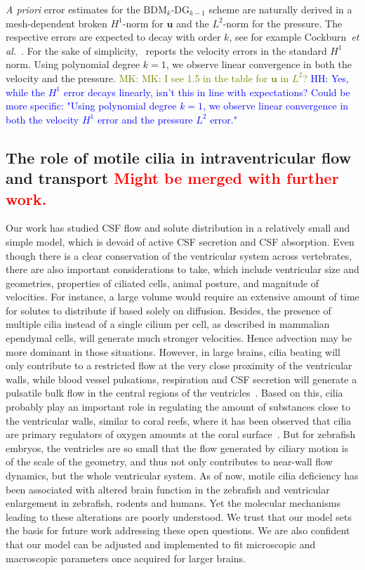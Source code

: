 \documentclass[fleqn]{wlscirep}
\newcommand{\uu}{\mathbf{u}}
\newcommand{\lyng}[1]{\textcolor{blue}{#1}}
\newcommand{\mk}[1]{\textcolor{olive}{MK: #1}}
\newcommand{\fixme}[1]{\textcolor{red}{#1}}
\begin{document}
\emph{A priori} error estimates for the $\mathrm{BDM}_k$-$\mathrm{DG}_{k-1}$ scheme are naturally 
derived in a mesh-dependent broken $H^1$-norm for $\uu$ and the $L^2$-norm for the pressure. The respective 
errors are expected to decay with order $k$,
see for example Cockburn~\emph{et al.}~\cite{Cockburn2005AEquations}.
For the sake of simplicity,~
reports the velocity errors in the standard $H^1$ norm. Using polynomial degree  
$k=1$, we observe linear convergence in both the velocity and the pressure.   
\mk{MK: I see 1.5 in the table for $\uu$ in $L^2$?}
\lyng{HH: Yes, while the $H^1$ error decays linearly, isn't this in line with expectations?
Could be more specific: "Using polynomial degree 
$k=1$, we observe linear convergence in both the velocity $H^1$ error and the pressure $L^2$ error."}

\subsection*{The role of motile cilia in intraventricular flow and transport
\fixme{Might be merged with further work.}}
Our work has studied CSF flow and solute distribution
in a relatively small and simple model, which is devoid of
active CSF secretion and CSF absorption. Even though there is
a clear conservation of the ventricular system across vertebrates,
there are also important considerations to take, which include
ventricular size and geometries, properties of ciliated cells,
animal posture, and magnitude of velocities. For instance, a large
volume would require an extensive amount of time for solutes to distribute
if based solely on diffusion. Besides, the presence of multiple cilia
instead of a single cilium per cell, as described in mammalian ependymal cells,
will generate much stronger velocities. Hence advection may be more
dominant in those situations. However, in large brains, cilia beating will
only contribute to a restricted flow at the very close proximity of the ventricular walls,
while blood vessel pulsations, respiration and CSF secretion will generate a
pulsatile bulk flow in the central regions of the ventricles~\cite{Siyahhan2014FlowVentricles}.
Based on this, cilia probably play an important role in regulating the
amount of substances close to the ventricular walls, similar to coral
reefs, where it has been observed that cilia are primary regulators of
oxygen amounts at the coral surface~\cite{Pacherres2022CiliaryProduction}.
But for zebrafish embryos, the ventricles are so small that the flow
generated by ciliary motion is of the scale of the geometry, and thus not
only contributes to near-wall flow dynamics, but the whole ventricular system.
As of now, motile cilia deficiency has been associated with altered brain function
in the zebrafish and ventricular enlargement in zebrafish, rodents and humans.
Yet the molecular mechanisms leading to these alterations are poorly understood.
We trust that our model sets the basis for future work addressing these open questions.
We are also confident that our model can be adjusted and implemented to fit
microscopic and macroscopic parameters once acquired for larger brains.
\end{document}
